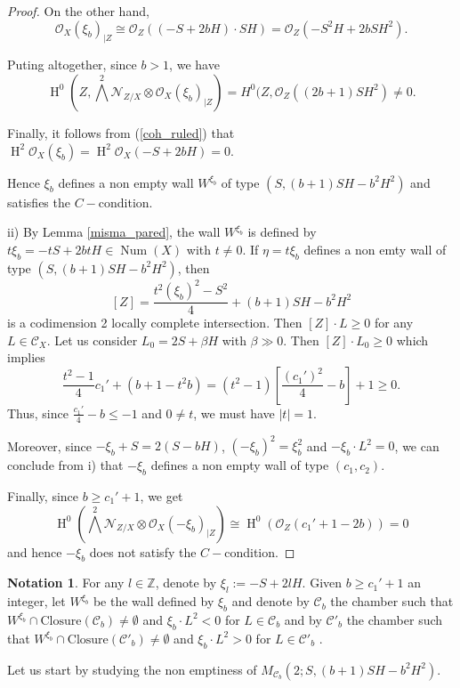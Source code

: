 \documentclass[11pt,twoside]{amsart}
\theoremstyle{definition}
\newtheorem{notation}[theorem]{Notation}
\newcommand {\Closure}{\mathrm{Closure}}
\newcommand{\Num}{\operatorname{Num}}
\newcommand{\Ho}{\operatorname{H}}
\begin{document}
\begin{proof}
On the other hand, $${\mathcal{O}_X(\xi_b)}_{|Z}\cong \mathcal{O}_Z((-S+2bH)\cdot SH)=\mathcal{O}_Z(-S^2H+2bSH^2).$$

Puting altogether, since $b>1$, we have $$\Ho^0(Z,{\bigwedge}^2{\mathcal{N}}_{Z/ X}\otimes \mathcal{O}_X(\xi_b)_{|Z})=H^0(Z,\mathcal{O}_Z((2b+1)SH^2)\neq0.$$ 

\noindent Finally, it follows from (\ref{coh_ruled})  that  $\Ho^2\mathcal{O}_X(\xi_b)=\Ho^2\mathcal{O}_X(-S+2bH)=0$.


Hence $\xi_b$ defines a non empty wall $W^{\xi_b}$ of type $(S, (b+1)SH-b^2H^2)$ and satisfies the $C-$condition.


ii) By Lemma \ref{misma_pared}, the wall $W^{\xi_b}$ is defined by $t\xi_b=-tS+2btH\in\Num(X)$ with $t\neq0$. If $\eta=t\xi_b$ defines a non emty wall of type $(S,(b+1)SH-b^2H^2)$, then $$[Z]=\frac{t^2(\xi_b)^2-S^2}{4}+(b+1)SH-b^2H^2 $$ is a codimension 2 locally complete intersection. Then $[Z]\cdot L\geq0$ for any $L\in\mathcal{C}_X$. Let us consider $L_0=2 S+\beta H$ with   $\beta\gg0$. Then $[Z]\cdot L_0\geq0$ which implies $$\frac{t^2-1}{4}c_1'+(b+1-t^2b)=(t^2-1)[\frac{(c_1')^2}{4}-b]+1\geq0.$$  Thus, since $\frac{c_1'}{4}-b\leq-1$ and $0\neq t$, we must have $|t|=1$.

Moreover, since $-\xi_b+S=2(S-bH)$, $(-\xi_b)^2=\xi_b^2$ and $-\xi_b\cdot L^2=0$, we can conclude from i) that $-\xi_b$ defines a non empty wall of type $(c_1,c_2)$.

Finally, since $b\geq c_1'+1$, we get $$\Ho^0 \left({\bigwedge}^2{\mathcal{N}}_{Z/ X}\otimes\mathcal{O}_X(-\xi_b)_{|Z}\right)\cong \Ho^0\left(\mathcal{O}_Z(c_1'+1-2b)\right)=0$$ and hence $-\xi_b$ does not satisfy the $C-$condition.
\end{proof}
\vspace{0.3cm}



\begin{notation} For any $l\in\mathbb{Z}$, denote by $\xi_l:=-S+2lH$. Given $b\geq c_1'+1$ an integer, let   $W^{\xi_b}$ be the wall defined by $\xi_b$ and  denote by $\mathcal{C}_b$ the chamber such that $W^{\xi_b}\cap \Closure(\mathcal{C}_b)\neq\emptyset$ and $\xi_b\cdot L^{2}<0$ for $L\in \mathcal{C}_b$ and  by $\mathcal{C}'_b$ the chamber such that $W^{\xi_b}\cap \Closure(\mathcal{C}'_b)\neq\emptyset$ and $\xi_b\cdot L^{2}>0$ for $L\in \mathcal{C}'_b$ . 
\end{notation}


Let us start by studying the non emptiness of  $M_{\mathcal{C}_b}(2;S,(b+1)SH-b^2H^2)$.
\end{document}
